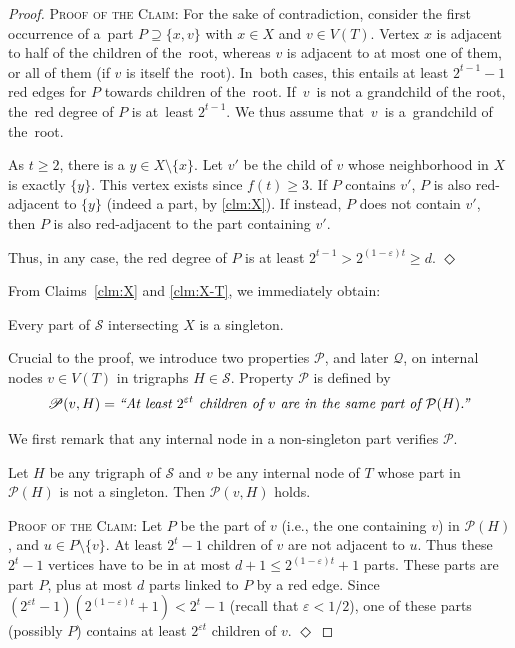 \documentclass[a4paper,UKenglish,cleveref,hyperref,autoref]{lipics-v2021}
\renewcommand{\geq}{\geqslant}
\renewcommand{\leq}{\leqslant}
\newenvironment{proofofclaim}{\noindent \textsc{Proof of the Claim:}}{\hfill$\Diamond$\medskip}
\renewcommand{\P}{{\mathcal P}}
\begin{document}
\begin{proof}
  \begin{proofofclaim}
    For the sake of contradiction, consider the first occurrence of a~part $P \supseteq \{x,v\}$ with $x \in X$ and $v \in V(T)$.
    Vertex $x$ is adjacent to half of the children of the~root, whereas $v$ is adjacent to at most one of them, or all of them (if $v$ is itself the~root).
    In~both cases, this entails at least $2^{t-1}-1$ red edges for $P$ towards children of the~root.
    If~$v$~is not a grandchild of the root, the~red degree of $P$ is at~least $2^{t-1}$.
    We thus assume that~$v$~is a~grandchild of the~root.
    
    As $t \geq 2$, there is a $y \in X \setminus \{x\}$.
    Let $v'$ be the child of $v$ whose neighborhood in $X$ is exactly $\{y\}$.
    This vertex exists since $f(t) \geq 3$.
    If $P$ contains $v'$, $P$ is also red-adjacent to $\{y\}$ (indeed a part, by \cref{clm:X}).
    If instead, $P$ does not contain $v'$, then $P$ is also red-adjacent to the part containing $v'$.
    
    Thus, in any case, the red degree of $P$ is at least $2^{t-1}> 2^{(1-\varepsilon) t} \geq d$.
  \end{proofofclaim}

  From Claims~\ref{clm:X} and \ref{clm:X-T}, we immediately obtain:
  \begin{claim}\label{clm:X-sing}
   Every part of $\mathcal S$ intersecting $X$ is a singleton.
  \end{claim}

  Crucial to the proof, we introduce two properties $\mathscr P$, and later $\mathscr Q$, on internal nodes $v \in V(T)$ in trigraphs $H \in \mathcal S$.
  Property $\mathscr P$ is defined by
  $$\mathscr P(v,H) = \text{\emph{``At least $2^{\varepsilon t}$ children of $v$ are in the same part of $\P(H)$.''}}$$
 
 We first remark that any internal node in a non-singleton part verifies $\mathscr P$.
 \begin{claim}\label{clm:large-children-batch}
   Let $H$ be any trigraph of $\mathcal S$ and $v$ be any internal node of $T$ whose part in $\P(H)$ is not a singleton.
   Then $\mathscr P(v,H)$ holds.
 \end{claim}

 \begin{proofofclaim}
  Let $P$ be the part of $v$ (i.e., the one containing $v$) in $\P(H)$, and $u \in P \setminus \{v\}$. 
  At least $2^t-1$ children of $v$ are not adjacent to $u$.
  Thus these $2^t-1$ vertices have to be in at most $d+1 \leq 2^{(1-\varepsilon) t}+1$ parts. These parts are part $P$, plus at most $d$ parts linked to $P$ by a red edge.
  Since $(2^{\varepsilon t}-1)(2^{(1-\varepsilon) t}+1) < 2^t-1$ (recall that $\varepsilon < 1/2$), one of these parts (possibly $P$) contains at least $2^{\varepsilon t}$ children of $v$. 
 \end{proofofclaim}


\end{proof}
\end{document}
